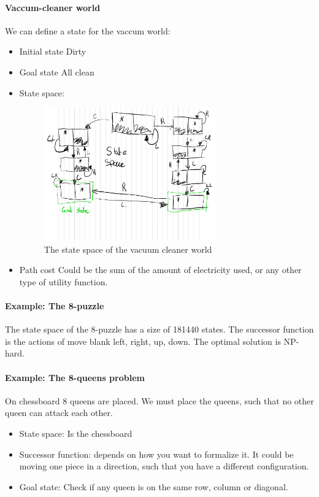 \documentclass{article}
\begin{document}
\paragraph{Vaccum-cleaner world}
We can define a state for the vaccum world:
\begin{itemize}[noitemsep]
  \item Initial state 
    \subitem Dirty
  \item Goal state
    \subitem All clean
  \item State space:
    \subitem 
    \begin{figure}[H]
      \center
      \includegraphics[width=0.7\textwidth]{./statespace.pdf}
      \caption{The state space of the vacuum cleaner world}
    \end{figure}
  \item Path cost
    \subitem Could be the sum of the amount of electricity used, or any other
    type of utility function.
\end{itemize}

\paragraph{Example: The 8-puzzle}
The state space of the 8-puzzle has a size of 181440 states. The successor
function is the actions of move blank left, right, up, down. The optimal
solution is NP-hard\cite[p. 17]{presentation:solving_problems_by_searching}.

\paragraph{Example: The 8-queens problem}
On chessboard 8 queens are placed. We must place the queens, such that no other
queen can attack each other. 
\begin{itemize}
  \item State space: Is the chessboard
  \item Successor function: depends on how you want to formalize it. It could be
    moving one piece in a direction, such that you have a different
    configuration.
  \item Goal state: Check if any queen is on the same row, column or diagonal.
\end{itemize}
\end{document}
